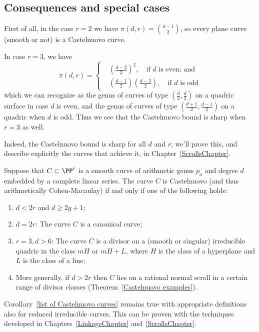  \subsection{Consequences and special cases}
 
 First of all, in the case $r=2$ we have $\pi(d,r) = \binom{d-1}{2}$, so every plane curve (smooth or not) is a Castelnuovo curve.
 
 In case $r=3$, we have
 $$
 \pi(d,r) =
 \begin{cases}
 &\left(\frac{d-2}{2} \right)^2, \quad \text{if $d$ is even; and} \\
 &\left(\frac{d-1}{2} \right)\left(\frac{d-3}{2} \right), \quad \text{if $d$ is odd}
 \end{cases}
 $$
 which we can recognize as the genus of curves of type $(\frac{d}{2}, \frac{d}{2} )$ on a quadric surface in case $d$ is even, and the genus of curves of type 
 $(\frac{d+1}{2}, \frac{d-1}{2} )$ on a quadric when $d$ is odd. Thus we see that the Castelnuovo bound is sharp when $r=3$ as well.
 
Indeed, the Castelnuovo bound is sharp for all $d$ and $r$; we'll prove this, and describe explicitly the curves that achieve it, in Chapter~\ref{ScrollsChapter}. 


\begin{corollary}\label{list of Castelnuovo curves}\label{Castelnuovo examples}
Suppose that $C\subset \PP^r$ is a smooth curve of arithmetic genus $p_{a}$ and degree $d$ embedded by a complete linear series. The curve $C$ is  Castelnuovo (and thus arithmetically Cohen-Macaulay) if and only if one of the following holds:
\begin{enumerate}
\item  $d<2r$ and  $d \geq 2g+1$;
\item $d=2r$: The curve $C$ is a canonical curve;
\item $r=3, d>6$: The curve $C$ is a divisor on a (smooth or singular) irreducible quadric in the class $mH$ or $mH+L$, where $H$ is the class of a hyperplane and $L$ is the class of a line;
\item  More generally,  if $d>2r$ then
$C$ lies on a rational normal scroll in a certain range of divisor classes (Theorem~\ref{Castelnuovo examples}).
\end{enumerate}
\end{corollary}

\begin{fact}
Corollary~\ref{list of Castelnuovo curves} remains true with appropriate definitions also for reduced irreducible curves. This can be proven with the techniques developed in Chapters~\ref{LinkageChapter} and~\ref{ScrollsChapter}.
\end{fact}

